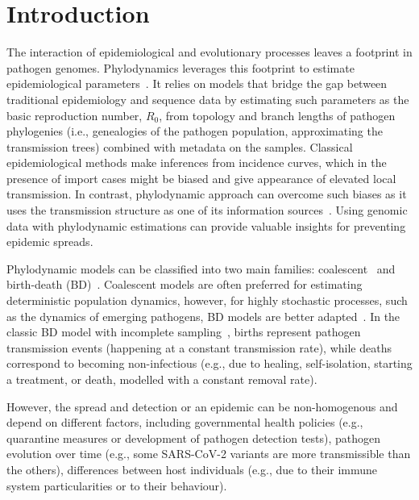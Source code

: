 \documentclass[10pt,letterpaper]{article}
\begin{document}
\linenumbers

\section*{Introduction}
The interaction of epidemiological and evolutionary processes leaves a footprint in pathogen genomes. Phylodynamics leverages this footprint to estimate epidemiological parameters~\cite{Grenfell2004a,Volz2013}. It relies on models that bridge the gap between traditional epidemiology and sequence data by estimating such parameters as the basic reproduction number, $R_0$, from topology and branch lengths of pathogen phylogenies (i.e., genealogies of the pathogen population, approximating the transmission trees) combined with metadata on the samples. Classical epidemiological methods make inferences from incidence curves, which in the presence of import cases might be biased and give appearance of elevated local transmission. In contrast, phylodynamic approach can overcome such biases as it uses the transmission structure as one of its information sources~\cite{vaughanEstimatesEarlyOutbreakspecific2024}. Using genomic data with phylodynamic estimations can provide valuable insights for preventing epidemic spreads.


Phylodynamic models can be classified into two main families:  coalescent~\cite{Volz2009a,Drummond2005,Pybus2000a} and birth-death (BD)~\cite{Kendall1948,Maddison2007,Stadler2009,Stadler2010}. Coalescent models are often preferred for estimating deterministic population dynamics, however, for highly stochastic processes, such as the dynamics of emerging pathogens, BD models are better adapted~\cite{Macpherson2021}. In the classic BD model with incomplete sampling~\cite{Stadler2009}, births represent pathogen transmission events (happening at a constant transmission rate), while deaths correspond to becoming non-infectious (e.g., due to healing, self-isolation, starting a treatment, or death, modelled with a constant removal rate). 

However, the spread and detection or an epidemic can be non-homogenous and depend on different factors, including governmental health policies (e.g., quarantine measures or development of pathogen detection tests), pathogen evolution over time (e.g., some SARS-CoV-2 variants are more transmissible than the others),  differences between host individuals (e.g., due to their immune system particularities or to their behaviour).
\end{document}
